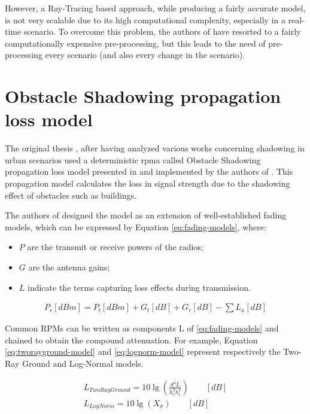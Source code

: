 		
		However, a Ray-Tracing based approach, while producing a fairly accurate model, is not very scalable due to its high computational complexity, especially in a real-time scenario. To overcome this problem, the authors of \cite{STEPANOV200861} have resorted to a fairly computationally expensive pre-processing, but this leads to the need of pre-processing every scenario (and also every change in the scenario).
		
		
	
	\section{Obstacle Shadowing propagation loss model}
		\label{sec:shadowing}
		The original thesis \cite{ROM2017}, after having analyzed various works concerning shadowing in urban scenarios \cite{Giordano:2010:CST:1860058.1860065} \cite{4020783} used a deterministic \gls{rpma} called Obstacle Shadowing propagation loss model presented in \cite{5720204} and implemented by the authors of \cite{Carpenter:2015:OMI:2756509.2756512}.  This propagation model calculates the loss in signal strength due to the shadowing effect of obstacles such as buildings. 
		
		
		The authors of \cite{5720204} designed the model as an extension of well-established fading models, which can be expressed by Equation \ref{eq:fading-models}, where:
		\begin{itemize}
			\item $P$ are the transmit or receive powers of the radios;
			\item $G$ are the antenna gains;
			\item $L$ indicate the terms capturing loss effects during transmission.
		\end{itemize}
		
		\begin{gather}
			P_r[dBm] = P_t[dBm] + G_t[dB] + G_r[dB] - \sum L_x[dB] 														\label{eq:fading-models}
		\end{gather}
	
		Common RPMs can be written as components L of \ref{eq:fading-models} and chained to obtain the compound attenuation. For example, Equation \ref{eq:tworayground-model} and \ref{eq:lognorm-model} represent respectively the Two-Ray Ground and Log-Normal models.

		\begin{gather}
			L_{TwoRayGround} = 10 \lg \left( \frac{d^4 L}{h^2_t h^2_t} \right)	\qquad [dB]		\label{eq:tworayground-model} \\
			L_{LogNorm} = 10 \lg \left( X_\sigma \right)	\qquad [dB]													\label{eq:lognorm-model}
		\end{gather}
		
